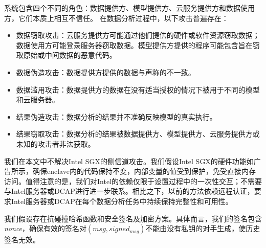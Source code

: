 系统包含四个不同的角色：数据提供方、模型提供方、云服务提供方和数据使用方，它们本质上相互不信任。
在数据分析过程中，以下攻击普遍存在：
\begin{itemize}
    \item 数据窃取攻击：云服务提供方可能通过他们提供的硬件或软件资源窃取数据；数据使用方可能登录服务器窃取数据。模型提供方提供的程序可能包含旨在窃取原始或中间数据的恶意代码。
    \item 数据伪造攻击：数据提供方提供的数据与声称的不一致。
    \item 数据滥用攻击：数据提供方的数据在没有适当授权的情况下被用于不同的模型和云服务器。
    \item 结果伪造攻击：数据分析的结果并不准确反映模型的真实执行。
    \item 结果窃取攻击：数据分析的结果被数据提供方、模型提供方、云服务提供方或未知的攻击者非法获取。
\end{itemize}

我们在本文中不解决Intel SGX的侧信道攻击。我们假设Intel SGX的硬件功能如广告所示，确保enclave内的代码保持不变，内部变量的值受到保护，免受直接内存访问。值得注意的是，我们对Intel的依赖仅限于设置过程中的一次性交互；不需要与Intel服务器或DCAP进行进一步联系。相比之下，以前的方法依赖远程认证，要求Intel服务器或DCAP在每个数据分析任务中持续保持完整性和可用性。

我们假设存在抗碰撞哈希函数和安全签名及加密方案。具体而言，我们的签名包含\textit{nonce}，确保有效的签名对$(msg, signed_{msg})$不能由没有私钥的对手生成，使历史签名无效。

